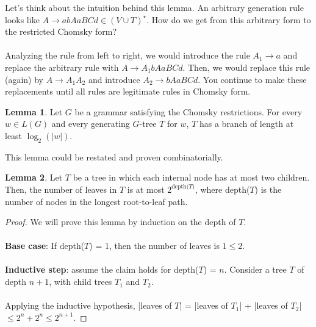 \documentclass[]{article}
\theoremstyle{definition}
\newtheorem*{lemma}{Lemma}
\begin{document}
      Let's think about the intuition behind this lemma. An arbitrary generation rule looks like $A \to abAaBCd \in (V \cup T)^\star$. How do we get from this arbitrary form to the restricted Chomsky form?
      \\ \\
      Analyzing the rule from left to right, we would introduce the rule $A_1 \to a$ and replace the arbitrary rule with $A \to A_1 bAaBCd$. Then, we would replace this rule (again) by $A \to A_1 A_2$ and introduce $A_2 \to bAaBCd$. You continue to make these replacements until all rules are legitimate rules in Chomsky form.

      \begin{lemma}
        \label{lemma2}
        Let $G$ be a grammar satisfying the Chomsky restrictions. For every $w \in L(G)$ and every generating $G$-tree $T$ for $w$, $T$ has a branch of length at least $\log_2(|w|)$.
      \end{lemma}

      This lemma could be restated and proven combinatorially.
      \begin{lemma}
        Let $T$ be a tree in which each internal node has at most two children. Then, the number of leaves in $T$ is at most $2^\text{depth($T$)}$, where depth($T$) is the number of nodes in the longest root-to-leaf path.
      \end{lemma}

      \begin{proof}
        We will prove this lemma by induction on the depth of $T$.
        \\ \\
        \textbf{Base case}: If depth($T$) = 1, then the number of leaves is $1 \le 2$.
        \\ \\
        \textbf{Inductive step}: assume the claim holds for depth($T$) = $n$. Consider a tree $T$ of depth $n + 1$, with child trees $T_1$ and $T_2$.
        \\ \\
        Applying the inductive hypothesis, |leaves of $T$| = |leaves of $T_1$| + |leaves of $T_2$| $\le 2^n + 2^n \le 2^{n + 1}$.
      \end{proof}
\end{document}
